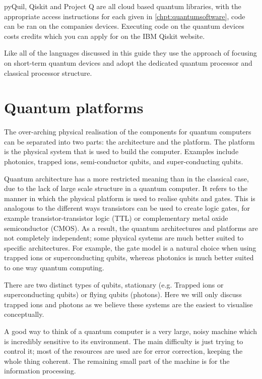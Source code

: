 pyQuil, Qiskit and Project Q are all cloud based quantum libraries, with the appropriate access instructions for each given in \autoref{chpt:quantumsoftware}, code can be ran on the companies devices. Executing code on the quantum devices costs credits which you can apply for on the IBM Qiskit website.  

Like all of the languages discussed in this guide they use the approach of focusing on short-term quantum devices and adopt the dedicated quantum processor and classical processor structure.



\section{Quantum platforms}

The over-arching physical realisation of the components for quantum computers can be separated into two parts: the architecture and the platform. The platform is the physical system that is used to build the computer. Examples include photonics, trapped ions, semi-conductor qubits, and super-conducting qubits.

Quantum architecture has a more restricted meaning than in the classical case, due to the lack of large scale structure in a quantum computer. It refers to the manner in which the physical platform is used to realise qubits and gates. This is analogous to the different ways transistors can be used to create logic gates, for example transistor-transistor logic (TTL) or complementary metal oxide semiconductor (CMOS). As a result, the quantum architectures and platforms are not completely independent; some physical systems are much better suited to specific architectures. For example, the gate model is a natural choice when using trapped ions or superconducting qubits, whereas photonics is much better suited to one way quantum computing.

There are two distinct types of qubits, stationary (e.g. Trapped ions or superconducting qubits) or flying qubits (photons). Here we will only discuss trapped ions and photons as we believe these systems are the easiest to visualise conceptually. 

A good way to think of a quantum computer is a very large, noisy machine which is incredibly sensitive to its environment. The main difficulty is just trying to control it; most of the resources are used are for error correction, keeping the whole thing coherent. The remaining small part of the machine is for the information processing. 


